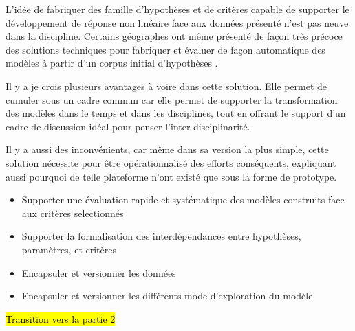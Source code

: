 L'idée de fabriquer des famille d'hypothèses et de critères capable de supporter le développement de réponse non linéaire face aux données présenté n'est pas neuve dans la discipline. Certains géographes ont même présenté de façon très précoce des solutions techniques pour fabriquer et évaluer de façon automatique des modèles à partir d'un corpus initial d'hypothèses \autocite{Openshaw1988}. 

Il y a je crois plusieurs avantages à voire dans cette solution. Elle permet de cumuler sous un cadre commun car elle permet de supporter la transformation des modèles dans le temps et dans les disciplines, tout en offrant le support d'un cadre de discussion idéal pour penser l'inter-disciplinarité.

Il y a aussi des inconvénients, car même dans sa version la plus simple, cette solution nécessite pour être opérationnalisé des efforts conséquents, expliquant aussi pourquoi de telle plateforme n'ont existé que sous la forme de prototype.

\begin{itemize}
\item Supporter une évaluation rapide et systématique des modèles construits face aux critères selectionnés
\item Supporter la formalisation des interdépendances entre hypothèses, paramètres, et critères
\item Encapsuler et versionner les données 
\item Encapsuler et versionner les différents mode d'exploration du modèle 
\end{itemize}

\hl{Transition vers la partie 2}





